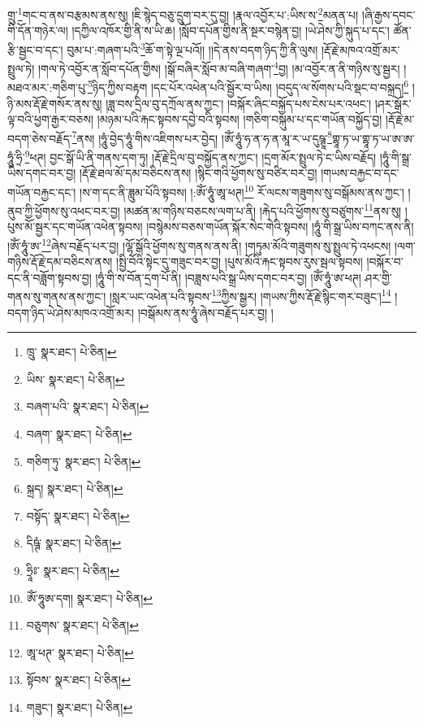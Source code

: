 གྲུ་\footnote{ཁྲུ་  སྣར་ཐང་།  པེ་ཅིན། }གང་བ་ནས་བརྩམས་ནས་སུ། །ཇི་སྙེད་བཅུ་དྲུག་བར་དུ་བྱ། །རྣལ་འབྱོར་པ་:ཡིས་ས་\footnote{ཡིས་  སྣར་ཐང་།  པེ་ཅིན། }མནན་པ། །ཞི་རྒྱས་དབང་གི་དོན་གཉེར་ལ། །དཀྱིལ་འཁོར་གྱི་ནི་ས་ཡི་ཆ། །སློབ་དཔོན་གྱིས་ནི་སྔར་བསྙེན་བྱ། །ཡེ་ཤེས་ཀྱི་སྐུད་པ་དང་། ཚོན་རྩི་སྦྱང་བ་དང་། བུམ་པ་:གཞག་པའི་\footnote{བཞག་པའི་  སྣར་ཐང་།  པེ་ཅིན། }ཆོ་ག་སྟེ་ལྔ་པའོ།། །།དེ་ནས་བདག་ཉིད་ཀྱི་ནི་ལུས། །རྡོ་རྗེ་མཁའ་འགྲོ་མར་སྤྲུལ་ཏེ། །གལ་ཏེ་འབྱོར་ན་སློབ་དཔོན་གྱིས། །སྒོ་བཞིར་སློབ་མ་བཞི་གཞག་\footnote{བཞག་  སྣར་ཐང་།  པེ་ཅིན། }བྱ། །མ་འབྱོར་ན་ནི་གཉིས་སུ་སྦྱར། །མཐའ་མར་:གཅིག་པུ་\footnote{གཅིག་ཏུ་  སྣར་ཐང་།  པེ་ཅིན། }ཉིད་ཀྱིས་བརྟག །དང་པོར་འཕེན་པའི་སྦྱོར་བ་ཡིས། །བདུད་ལ་སོགས་པའི་སྡང་བ་བསྐྲད།\footnote{སྐྲད།  སྣར་ཐང་།  པེ་ཅིན། } །ཉི་མས་རྡོ་རྗེ་གསོར་ནས་སུ། །ཟླ་བས་དྲིལ་བུ་དཀྲོལ་ནས་ཀྱང་། །བསྐོར་ཞིང་བསྐྱོད་པས་ངེས་པར་འཕང་། །ཤར་སྒོར་ལྟ་བའི་ཕྱག་རྒྱར་བཅས། །མཉམ་པའི་རྐང་སྟབས་དབྱེ་བའི་སྟབས། །གཅིག་བསྐུམ་པ་དང་གཡོན་བསྐྱོད་བྱ། །རྡོ་རྗེ་མ་བདག་ཅེས་བརྗོད་\footnote{བསྟོད་  སྣར་ཐང་།  པེ་ཅིན། }ནས། །ཧཱུཾ་བྱེད་ཧཱུཾ་གིས་འཇིགས་པར་བྱེད། །ཨོཾ་ཧཱུཾ་ཧ་ན་ཧ་ན་མཱ་ར་ཡ་དུཥྚཱ་\footnote{དིཥྚཾ་  སྣར་ཐང་།  པེ་ཅིན། }གྷཱ་ཏ་ཡ་གྷཱ་ཏ་ཡ་ཨ་ཨ་ཧཱུཾ་ཧྲི་\footnote{ཧྲཱིཿ་  སྣར་ཐང་།  པེ་ཅིན། }ཕཊ། བྱང་སྒོ་ཡི་ནི་གནས་དག་ཏུ། །རྡོ་རྗེ་དྲིལ་བུ་བསྐྱོད་ནས་ཀྱང་། །དྲག་མོར་སྤྲུལ་ཏེ་ང་ཡིས་བརྗོད། །ཧཱུཾ་གི་སྒྲ་ཡིས་དགང་བར་བྱ། །རྡོ་རྗེ་ཐལ་མོ་དམ་བཅིངས་ནས། །སྙིང་གའི་ཕྱོགས་སུ་བཙིར་བར་བྱ། །གཡས་བརྐྱང་བ་དང་གཡོན་བརྐྱང་དང་། །ས་ག་དང་ནི་ཟླུམ་པོའི་སྟབས། །:ཨོཾ་ཧཱུཾ་ཨཱ་ཕཊ།\footnote{ཨོཾ་ཧཱུཨ་དག།  སྣར་ཐང་།  པེ་ཅིན། } རོ་ལངས་གཟུགས་སུ་བསྒོམས་ནས་ཀྱང་། །ནུབ་ཀྱི་ཕྱོགས་སུ་འཕང་བར་བྱ། །མཚན་མ་གཉིས་བཅངས་ལག་པ་ནི། །རྐེད་པའི་ཕྱོགས་སུ་བཙུགས་\footnote{བཅུགས་  སྣར་ཐང་།  པེ་ཅིན། }ནས་སུ། །པུས་མོ་སྦྱར་དང་གཡོན་འཕེན་སྟབས། །བསྙེམས་བཅས་གཡོན་སྐོར་སེང་གེའི་སྟབས། །ཧཱུཾ་གི་སྒྲ་ཡིས་བཀང་ནས་ནི། །ཨོཾ་ཧཱུཾ་ཨ་\footnote{ཨཱ་ཕཊ་  སྣར་ཐང་།  པེ་ཅིན། }ཞེས་བརྗོད་པར་བྱ། །ལྷོ་སྒོའི་ཕྱོགས་སུ་གནས་ནས་ནི། །གཏུམ་མོའི་གཟུགས་སུ་སྤྲུལ་ཏེ་འཕངས། །ལག་གཉིས་རྡོ་རྗེ་དམ་བཅིངས་ནས། །སྤྱི་བོའི་སྟེང་དུ་གཟུང་བར་བྱ། །པུས་མོའི་རྐང་སྟབས་རུས་སྦལ་སྟབས། །བསྐོར་བ་དང་ནི་བཟློག་སྟབས་བྱ། །ཧཱུཾ་གི་ས་བོན་དྲག་པོ་ནི། །བཟླས་པའི་སྒྲ་ཡིས་དགང་བར་བྱ། །ཨོཾ་ཧཱུཾ་ཨ་ཕཊ། ཤར་གྱི་གནས་སུ་གནས་ནས་ཀྱང་། །སླར་ཡང་འཕེན་པའི་སྟབས་\footnote{སྟོབས་  སྣར་ཐང་།  པེ་ཅིན། }ཀྱིས་སྒྱར། །གཡས་ཀྱིས་རྡོ་རྗེ་སྙིང་གར་བཟུང་།\footnote{གཟུང་།  སྣར་ཐང་།  པེ་ཅིན། } །བདག་ཉིད་ཡེ་ཤེས་མཁའ་འགྲོ་མར། །བསྒོམས་ནས་ཧཱུཾ་ཞེས་བརྗོད་པར་བྱ། །
